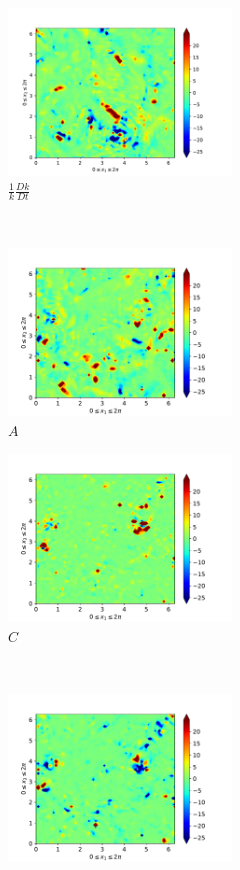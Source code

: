 \begin{figure}[H]
    \begin{subfigure}[H]{0.45\textwidth}
        \includegraphics[height=1.75in]{media/run-cds-65/ke-1440}
        \caption{$\frac{1}{k} \frac{D k}{Dt}$}
    \end{subfigure}
    ~
    \begin{subfigure}{0.45\textwidth}
        \includegraphics[height=1.75in]{media/run-cds-65/A-ke-1440}
        \caption{$A$}
    \end{subfigure}
    \newline
    \begin{subfigure}{0.45\textwidth}
        \includegraphics[height=1.75in]{media/run-cds-65/C-ke-1440}
        \caption{$C$}
    \end{subfigure}
    ~
    \begin{subfigure}{0.45\textwidth}
        \includegraphics[height=1.75in]{media/run-cds-65/P-ke-1440}

\end{subfigure}
\end{figure}
